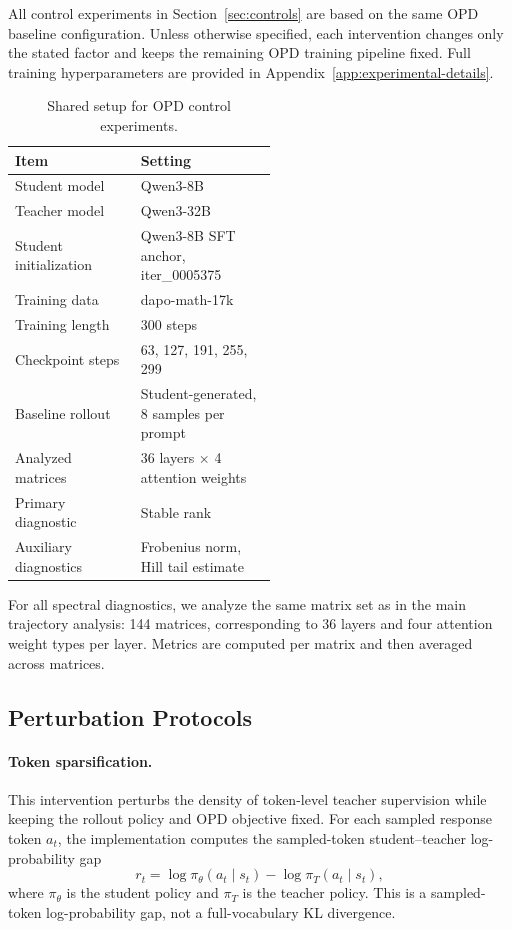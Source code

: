 All control experiments in Section~\ref{sec:controls} are based on the
same OPD baseline configuration. Unless otherwise specified, each
intervention changes only the stated factor and keeps the remaining OPD
training pipeline fixed. Full training hyperparameters are provided in
Appendix~\ref{app:experimental-details}.
\begin{table}[t]
\centering
\setlength{\tabcolsep}{4pt}
\begin{tabular}{@{}lp{0.52\linewidth}@{}}
\toprule
Item & Setting \\
\midrule
Student model & Qwen3-8B \\
Teacher model & Qwen3-32B \\
Student initialization & Qwen3-8B SFT anchor, iter\_0005375 \\
Training data & dapo-math-17k \\
Training length & 300 steps \\
Checkpoint steps & 63, 127, 191, 255, 299 \\
Baseline rollout & Student-generated, 8 samples per prompt \\
Analyzed matrices & 36 layers $\times$ 4 attention weights \\
Primary diagnostic & Stable rank \\
Auxiliary diagnostics & Frobenius norm, Hill tail estimate \\
\bottomrule
\end{tabular}
\caption{Shared setup for OPD control experiments.}
\label{tab:control-shared-setup}
\end{table}

For all spectral diagnostics, we analyze the same matrix set as in the main
trajectory analysis: 144 matrices, corresponding to 36 layers and four
attention weight types per layer. Metrics are computed per matrix and then
averaged across matrices.

\subsection{Perturbation Protocols}
\label{app:control-protocols}
\paragraph{Token sparsification.}
This intervention perturbs the density of token-level teacher supervision
while keeping the rollout policy and OPD objective fixed. For each sampled
response token $a_t$, the implementation computes the sampled-token
student--teacher log-probability gap
\[
    r_t
    =
    \log \pi_\theta(a_t\mid s_t)
    -
    \log \pi_T(a_t\mid s_t),
\]
where $\pi_\theta$ is the student policy and $\pi_T$ is the teacher policy.
This is a sampled-token log-probability gap, not a full-vocabulary KL
divergence.

